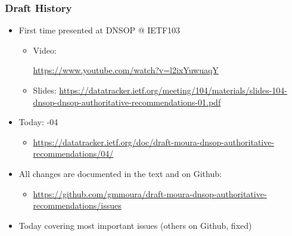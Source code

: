 \documentclass[11pt,show 
notes,notheorems,noamsthm,blank]{beamer} %
\begin{document}
\begin{frame}
\frametitle{Draft History}


\begin{itemize}


\item  First time presented at DNSOP  @ IETF103
    \begin{itemize}
     \item Video: \begin{tiny} \url{https://www.youtube.com/watch?v=l2ixYuwuaqY} \end{tiny}
     \item Slides: \tiny  \url{https://datatracker.ietf.org/meeting/104/materials/slides-104-dnsop-dnsop-authoritative-recommendations-01.pdf}
    \end{itemize}
    
\item Today: -04 
\begin{itemize}
 \item   \begin{tiny}  \url{https://datatracker.ietf.org/doc/draft-moura-dnsop-authoritative-recommendations/04/} \end{tiny}
\end{itemize}

\item All changes are documented in the text and on Github:
\begin{itemize}
 \item \begin{tiny}  \url{https://github.com/gmmoura/draft-moura-dnsop-authoritative-recommendations/issues} \end{tiny}
\end{itemize}


\item Today covering most important  issues (others on Github, fixed)




\end{itemize}
\end{frame}
\end{document}

